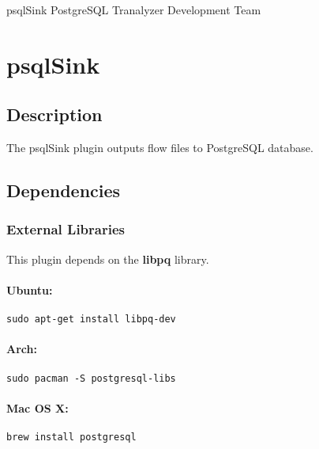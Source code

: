 \documentclass[documentation]{subfiles}
\begin{document}
\trantitle
    {psqlSink} %
    {PostgreSQL} %
    {Tranalyzer Development Team} %

\section{psqlSink}\label{s:psqlSink}

\subsection{Description}
The psqlSink plugin outputs flow files to PostgreSQL database.

\subsection{Dependencies}

\subsubsection{External Libraries}
This plugin depends on the {\bf libpq} library.
\paragraph{Ubuntu:} {\tt sudo apt-get install libpq-dev}
\paragraph{Arch:} {\tt sudo pacman -S postgresql-libs}
\paragraph{Mac OS X:} {\tt brew install postgresql}
\end{document}
